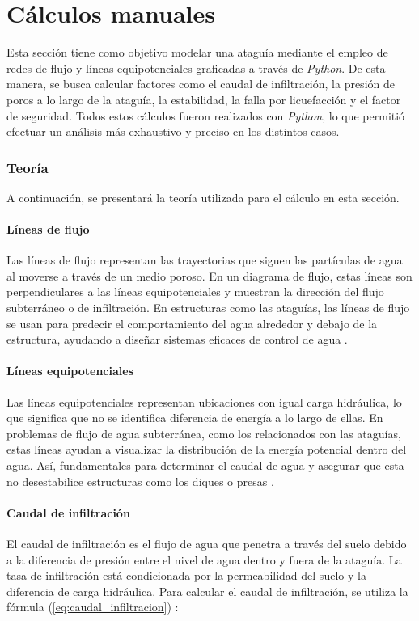 \part{Cálculos manuales}

Esta sección tiene como objetivo modelar una ataguía mediante el empleo de redes de flujo y líneas equipotenciales graficadas a través de \textit{Python}. De esta manera, se busca calcular factores como el caudal de infiltración, la presión de poros a lo largo de la ataguía, la estabilidad, la falla por licuefacción y el factor de seguridad. Todos estos cálculos fueron realizados con \textit{Python}, lo que permitió efectuar un análisis más exhaustivo y preciso en los distintos casos.

\section{Teoría}

A continuación, se presentará la teoría utilizada para el cálculo en esta sección.

\subsection{Líneas de flujo}
Las líneas de flujo representan las trayectorias que siguen las partículas de agua al moverse a través de un medio poroso. En un diagrama de flujo, estas líneas son perpendiculares a las líneas equipotenciales y muestran la dirección del flujo subterráneo o de infiltración. En estructuras como las ataguías, las líneas de flujo se usan para predecir el comportamiento del agua alrededor y debajo de la estructura, ayudando a diseñar sistemas eficaces de control de agua \citep{structville}.

\subsection{Líneas equipotenciales}
Las líneas equipotenciales representan ubicaciones con igual carga hidráulica, lo que significa que no se identifica diferencia de energía a lo largo de ellas. En problemas de flujo de agua subterránea, como los relacionados con las ataguías, estas líneas ayudan a visualizar la distribución de la energía potencial dentro del agua. Así, fundamentales para determinar el caudal de agua y asegurar que esta no desestabilice estructuras como los diques o presas \citep{structville}.

\subsection{Caudal de infiltración}
El caudal de infiltración es el flujo de agua que penetra a través del suelo debido a la diferencia de presión entre el nivel de agua dentro y fuera de la ataguía. La tasa de infiltración está condicionada por la permeabilidad del suelo y la diferencia de carga hidráulica. Para calcular el caudal de infiltración, se utiliza la fórmula (\ref{eq:caudal_infiltracion}) \citep{stability_cofferdam_2024}:

